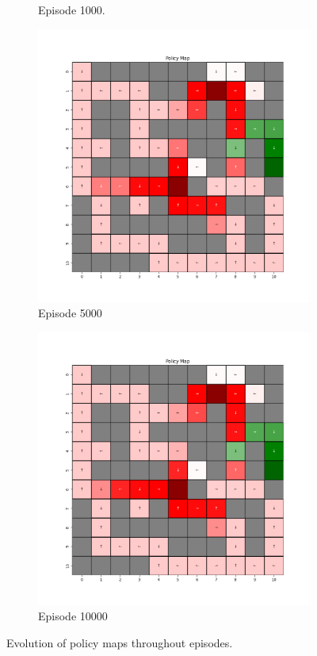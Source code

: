 \documentclass{assignment}
\begin{document}
\begin{figure}[H]
\begin{subfigure}{0.3\textwidth}
    \caption{Episode 1000.}
    \end{subfigure}\hfill
    \begin{subfigure}{0.3\textwidth}
        \includegraphics[width=\textwidth]{figures/policy_td/alpha_sweep/policy_alpha_1_gamma_0.95_epsilon_0.2_iteration_5000.png}
    \caption{Episode 5000}
    \end{subfigure}\hfill
    \begin{subfigure}{0.3\textwidth}
        \includegraphics[width=\textwidth]{figures/policy_td/alpha_sweep/policy_alpha_1_gamma_0.95_epsilon_0.2_iteration_10000.png}
    \caption{Episode 10000}
    \end{subfigure}
    \caption{Evolution of policy maps throughout episodes.}
    \label{fig:alpha_1_td_learning_policy}
\end{figure}
\end{document}
